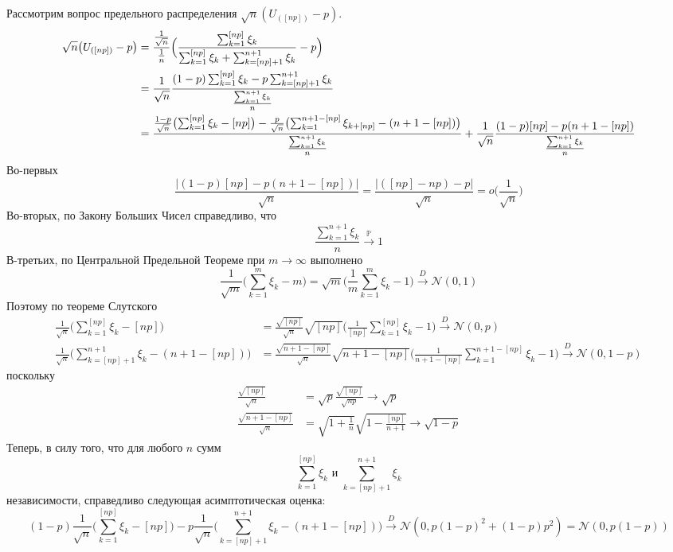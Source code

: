 \documentclass[a4paper]{article}
\newcommand{\Ncal}{\mathcal{N}}
\newcommand{\pr}[0]{{\mathbb{P}}}
\begin{document}
Рассмотрим вопрос предельного распределения $\sqrt{n}(U_{([np])} - p)$.
\begin{align*}
	\sqrt{n} \bigl( U_{([np])} - p \bigr)
	&= \frac{\frac{1}{\sqrt{n}}}{\frac{1}{n}}\Bigl(
		\frac{\sum_{k=1}^{[np]} \xi_k}{\sum_{k=1}^{[np]} \xi_k + \sum_{k=[np]+1}^{n+1} \xi_k} - p \Bigr)\\
	&= \frac{1}{\sqrt{n}}\frac{(1-p)\sum_{k=1}^{[np]} \xi_k - p \sum_{k=[np]+1}^{n+1} \xi_k}{\frac{\sum_{k=1}^{n+1} \xi_k}{n}}\\

	&= \frac{\frac{1-p}{\sqrt{n}}\bigl(\sum_{k=1}^{[np]} \xi_k - [np]\bigr)
			- \frac{p}{\sqrt{n}}\bigl(\sum_{k=1}^{n+1-[np]} \xi_{k+[np]} - (n+1-[np])\bigr)}{\frac{\sum_{k=1}^{n+1} \xi_k}{n}}
		+ \frac{1}{\sqrt{n}}\frac{(1-p)[np] - p(n+1-[np])}{\frac{\sum_{k=1}^{n+1} \xi_k}{n}}
\end{align*}
Во-первых
\[
\frac{\lvert(1-p)[np] - p(n+1-[np])\rvert}{\sqrt{n}}
= \frac{\lvert ([np] - np) - p\rvert}{\sqrt{n}}
= o\bigl(\frac{1}{\sqrt{n}}\bigr)
\]
Во-вторых, по Закону Больших Чисел справедливо, что
\[\frac{\sum_{k=1}^{n+1} \xi_k}{n} \overset{\pr}{\to} 1\]
В-третьих, по Центральной Предельной Теореме при $m\to \infty$ выполнено
\[
\frac{1}{\sqrt{m}}\bigl(\sum_{k=1}^m \xi_k - m\bigr)
= \sqrt{m}\bigl(\frac{1}{m}\sum_{k=1}^m \xi_k - 1\bigr)
\overset{D}{\to} \Ncal(0,1)
\]
Поэтому по теореме Слутского
\begin{align*}
	\frac{1}{\sqrt{n}}\bigl(\sum_{k=1}^{[np]} \xi_k - [np]\bigr)
	&= \frac{\sqrt{[np]}}{\sqrt{n}}
		\sqrt{[np]}\bigl(\frac{1}{[np]}\sum_{k=1}^{[np]} \xi_k - 1\bigr)
		\overset{D}{\to} \Ncal(0,p)\\
	\frac{1}{\sqrt{n}}\bigl(\sum_{k=[np]+1}^{n+1} \xi_k - (n+1-[np])\bigr)
	&= \frac{\sqrt{n+1-[np]}}{\sqrt{n}}
		\sqrt{n+1-[np]}\bigl(\frac{1}{n+1-[np]}\sum_{k=1}^{n+1-[np]} \xi_k - 1\bigr)
		\overset{D}{\to} \Ncal(0,1-p)
\end{align*}
поскольку
\begin{align*}
	\frac{\sqrt{[np]}}{\sqrt{n}}
	&= \sqrt{p} \frac{\sqrt{[np]}}{\sqrt{np}}
		\to \sqrt{p}\\
	\frac{\sqrt{n+1-[np]}}{\sqrt{n}}
	&= \sqrt{1+\frac{1}{n}} \sqrt{1-\frac{[np]}{n+1}}
		\to \sqrt{1-p}
\end{align*}
Теперь, в силу того, что для любого $n$ сумм 
\[\sum_{k=1}^{[np]} \xi_k\text{ и }\sum_{k=[np]+1}^{n+1} \xi_k\]
независимости, справедливо следующая асимптотическая оценка:
\[
(1-p)\frac{1}{\sqrt{n}}\bigl(\sum_{k=1}^{[np]} \xi_k - [np]\bigr)
- p\frac{1}{\sqrt{n}}\bigl(\sum_{k=[np]+1}^{n+1} \xi_k - (n+1-[np])\bigr)
\overset{D}{\to} \Ncal(0, p(1-p)^2 + (1-p)p^2)
= \Ncal(0, p(1-p))
\]
\end{document}
